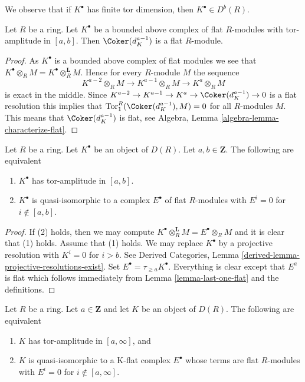 \noindent
We observe that if $K^\bullet$ has finite tor dimension,
then $K^\bullet \in D^b(R)$.

\begin{lemma}
\label{lemma-last-one-flat}
Let $R$ be a ring. Let $K^\bullet$ be a bounded above complex of
flat $R$-modules with tor-amplitude in $[a, b]$.
Then $\Coker(d_K^{a - 1})$ is a flat $R$-module.
\end{lemma}

\begin{proof}
As $K^\bullet$ is a bounded above complex of flat modules we see
that $K^\bullet \otimes_R M = K^\bullet \otimes_R^{\mathbf{L}} M$.
Hence for every $R$-module $M$ the sequence
$$
K^{a - 2} \otimes_R M \to K^{a - 1} \otimes_R M \to K^a \otimes_R M
$$
is exact in the middle. Since
$K^{a - 2} \to K^{a - 1} \to K^a \to \Coker(d_K^{a - 1}) \to 0$
is a flat resolution this implies that
$\text{Tor}_1^R(\Coker(d_K^{a - 1}), M) = 0$
for all $R$-modules $M$. This means that
$\Coker(d_K^{a - 1})$ is flat, see
Algebra, Lemma \ref{algebra-lemma-characterize-flat}.
\end{proof}

\begin{lemma}
\label{lemma-tor-amplitude}
Let $R$ be a ring. Let $K^\bullet$ be an object of $D(R)$.
Let $a, b \in \mathbf{Z}$. The following are equivalent
\begin{enumerate}
\item $K^\bullet$ has tor-amplitude in $[a, b]$.
\item $K^\bullet$ is quasi-isomorphic to a complex
$E^\bullet$ of flat $R$-modules with $E^i = 0$ for $i \not \in [a, b]$.
\end{enumerate}
\end{lemma}

\begin{proof}
If (2) holds, then we may compute
$K^\bullet \otimes_R^\mathbf{L} M = E^\bullet \otimes_R M$
and it is clear that (1) holds.
Assume that (1) holds. We may replace $K^\bullet$ by
a projective resolution with $K^i = 0$ for $i > b$.
See Derived Categories, Lemma \ref{derived-lemma-projective-resolutions-exist}.
Set $E^\bullet = \tau_{\geq a}K^\bullet$. Everything is clear except
that $E^a$ is flat which follows immediately from
Lemma \ref{lemma-last-one-flat}
and the definitions.
\end{proof}

\begin{lemma}
\label{lemma-bounded-below-tor-amplitude}
Let $R$ be a ring. Let $a \in \mathbf{Z}$ and let $K$ be an object of $D(R)$.
The following are equivalent
\begin{enumerate}
\item $K$ has tor-amplitude in $[a, \infty]$, and
\item $K$ is quasi-isomorphic to a K-flat complex
$E^\bullet$ whose terms are flat $R$-modules with
$E^i = 0$ for $i \not \in [a, \infty]$.
\end{enumerate}
\end{lemma}

